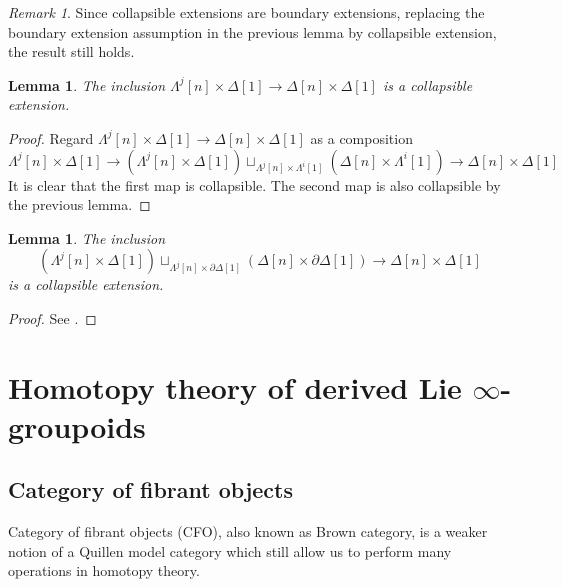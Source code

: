 \documentclass[12pt]{amsart}
\newtheorem{lem}[thm]{Lemma}
\theoremstyle{definition}
\theoremstyle{remark}
\newtheorem{rem}[thm]{Remark}
\numberwithin{equation}{section}
\newcommand{\del}{\partial}
\renewcommand{\del}{\partial}
\newcommand{\1}{{\mathbb{1}}}
\begin{document}
\begin{rem} Since collapsible extensions are boundary extensions, 
    replacing the boundary extension assumption in the previous lemma by collapsible extension, the result still holds.
\end{rem}
\begin{lem}
    The inclusion $\Lambda^j[n]\times \Delta[1] \to \Delta[n]\times \Delta[1]$ is a collapsible extension.
\end{lem}
\begin{proof}
    Regard $\Lambda^j[n]\times \Delta[1] \to \Delta[n]\times \Delta[1]$ as a composition
    \begin{equation*}
        \Lambda^j[n]\times \Delta[1] \to (\Lambda^j[n] \times \Delta[1]) \sqcup_{\Lambda^j[n] \times \Lambda^i[1] }(\Delta[n] \times \Lambda^i[1])\to \Delta[n]\times \Delta[1]
    \end{equation*}
    It is clear that the first map is collapsible. The second map is also collapsible by the previous lemma.
\end{proof}

\begin{lem}\label{c5}
    The inclusion 
    $$(\Lambda^j[n] \times \Delta[1]) \sqcup_{\Lambda^j[n] \times \del\Delta[1] }(\Delta[n] \times \del\Delta[1])\to \Delta[n]\times \Delta[1]$$
    is a collapsible extension.
\end{lem}
\begin{proof}
    See \cite[Appendix A]{RZ20}.
\end{proof}
\section{Homotopy theory of derived Lie $\infty$-groupoids}

\subsection{Category of fibrant objects}
Category of fibrant objects (CFO), also known as Brown category, is a weaker notion of a Quillen model category which still allow us to perform many operations in homotopy theory.
\end{document}
